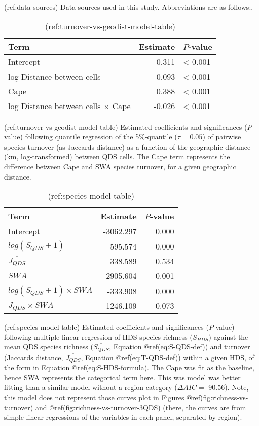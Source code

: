 (ref:data-sources) Data sources used in this study. Abbreviations are as
follows:.

\begin{table}[!h]
\caption{\label{tab:turnover-vs-geodist-model-table}(ref:turnover-vs-geodist-model-table)}

\centering
\begin{tabular}[t]{lrl}
\toprule
Term & Estimate & $P$-value\\
\midrule
Intercept & -0.311 & < 0.001\\
log Distance between cells & 0.093 & < 0.001\\
Cape & 0.388 & < 0.001\\
log Distance between cells $\times$ Cape & -0.026 & < 0.001\\
\bottomrule
\end{tabular}
\end{table}

(ref:turnover-vs-geodist-model-table) Estimated coefficients and
significances (\(P\)-value) following quantile regression of the
5\%-quantile (\(\tau = 0.05\)) of pairwise species turnover (as Jaccards
distance) as a function of the geographic distance (km, log-transformed)
between QDS cells. The Cape term represents the difference between Cape
and SWA species turnover, for a given geographic distance.

\begin{table}[!h]
\caption{\label{tab:species-model-table}(ref:species-model-table)}

\centering
\begin{tabular}[t]{lrr}
\toprule
Term & Estimate & $P$-value\\
\midrule
Intercept & -3062.297 & 0.000\\
$log(\overline{S_{QDS}} + 1)$ & 595.574 & 0.000\\
$\overline{J_{QDS}}$ & 338.589 & 0.534\\
$SWA$ & 2905.604 & 0.001\\
$log(\overline{S_{QDS}} + 1) \times SWA$ & -333.908 & 0.000\\
$\overline{J_{QDS}} \times SWA$ & -1246.109 & 0.073\\
\bottomrule
\end{tabular}
\end{table}

(ref:species-model-table) Estimated coefficients and significances
(\(P\)-value) following multiple linear regression of HDS species
richness (\(S_{HDS}\)) against the mean QDS species richness
(\(\overline{S_{QDS}}\), Equation @ref(eq:S-QDS-def)) and turnover
(Jaccards distance, \(\overline{J_{QDS}}\), Equation @ref(eq:T-QDS-def))
within a given HDS, of the form in Equation @ref(eq:S-HDS-formula). The
Cape was fit as the baseline, hence SWA represents the categorical term
here. This was model was better fitting than a similar model without a
region category (\(\Delta AIC =\) 90.56). Note, this model does not
represent those curves plot in Figures @ref(fig:richness-vs-turnover)
and @ref(fig:richness-vs-turnover-3QDS) (there, the curves are from
simple linear regressions of the variables in each panel, separated by
region).

